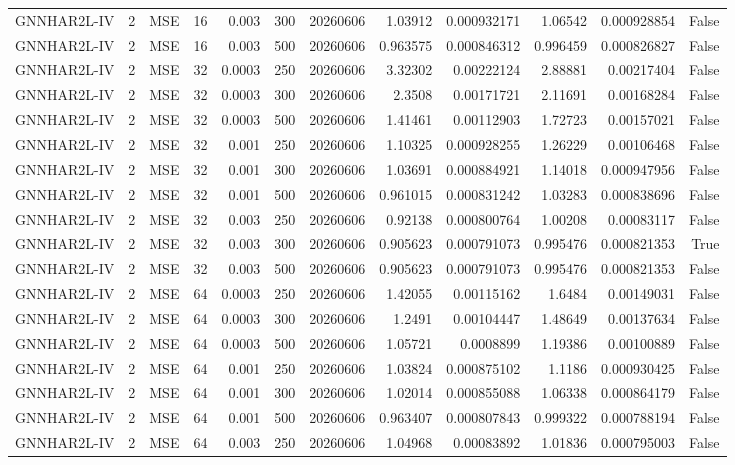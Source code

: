 \begin{tabular}{lrlrrrrrrrrr}
GNNHAR2L-IV & 2 & MSE & 16 & 0.003 & 300 & 20260606 & 1.03912 & 0.000932171 & 1.06542 & 0.000928854 & False \\
GNNHAR2L-IV & 2 & MSE & 16 & 0.003 & 500 & 20260606 & 0.963575 & 0.000846312 & 0.996459 & 0.000826827 & False \\
GNNHAR2L-IV & 2 & MSE & 32 & 0.0003 & 250 & 20260606 & 3.32302 & 0.00222124 & 2.88881 & 0.00217404 & False \\
GNNHAR2L-IV & 2 & MSE & 32 & 0.0003 & 300 & 20260606 & 2.3508 & 0.00171721 & 2.11691 & 0.00168284 & False \\
GNNHAR2L-IV & 2 & MSE & 32 & 0.0003 & 500 & 20260606 & 1.41461 & 0.00112903 & 1.72723 & 0.00157021 & False \\
GNNHAR2L-IV & 2 & MSE & 32 & 0.001 & 250 & 20260606 & 1.10325 & 0.000928255 & 1.26229 & 0.00106468 & False \\
GNNHAR2L-IV & 2 & MSE & 32 & 0.001 & 300 & 20260606 & 1.03691 & 0.000884921 & 1.14018 & 0.000947956 & False \\
GNNHAR2L-IV & 2 & MSE & 32 & 0.001 & 500 & 20260606 & 0.961015 & 0.000831242 & 1.03283 & 0.000838696 & False \\
GNNHAR2L-IV & 2 & MSE & 32 & 0.003 & 250 & 20260606 & 0.92138 & 0.000800764 & 1.00208 & 0.00083117 & False \\
GNNHAR2L-IV & 2 & MSE & 32 & 0.003 & 300 & 20260606 & 0.905623 & 0.000791073 & 0.995476 & 0.000821353 & True \\
GNNHAR2L-IV & 2 & MSE & 32 & 0.003 & 500 & 20260606 & 0.905623 & 0.000791073 & 0.995476 & 0.000821353 & False \\
GNNHAR2L-IV & 2 & MSE & 64 & 0.0003 & 250 & 20260606 & 1.42055 & 0.00115162 & 1.6484 & 0.00149031 & False \\
GNNHAR2L-IV & 2 & MSE & 64 & 0.0003 & 300 & 20260606 & 1.2491 & 0.00104447 & 1.48649 & 0.00137634 & False \\
GNNHAR2L-IV & 2 & MSE & 64 & 0.0003 & 500 & 20260606 & 1.05721 & 0.0008899 & 1.19386 & 0.00100889 & False \\
GNNHAR2L-IV & 2 & MSE & 64 & 0.001 & 250 & 20260606 & 1.03824 & 0.000875102 & 1.1186 & 0.000930425 & False \\
GNNHAR2L-IV & 2 & MSE & 64 & 0.001 & 300 & 20260606 & 1.02014 & 0.000855088 & 1.06338 & 0.000864179 & False \\
GNNHAR2L-IV & 2 & MSE & 64 & 0.001 & 500 & 20260606 & 0.963407 & 0.000807843 & 0.999322 & 0.000788194 & False \\
GNNHAR2L-IV & 2 & MSE & 64 & 0.003 & 250 & 20260606 & 1.04968 & 0.00083892 & 1.01836 & 0.000795003 & False \\

\end{tabular}
